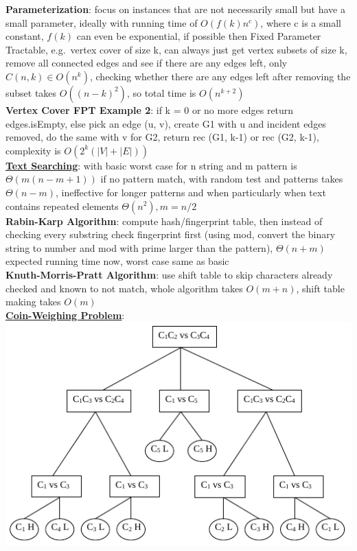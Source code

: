 \documentclass[a4paper]{article}
\begin{document}
\begin{multicols}{2}
        \textbf{Parameterization}: focus on instances that are not necessarily small but have a small parameter, ideally with running time of $O(f(k)n^c)$, where c is a small constant, $f(k)$ can even be exponential, if possible then Fixed Parameter Tractable, e.g.\ vertex cover of size k, can always just get vertex subsets of size k, remove all connected edges and see if there are any edges left, only $C(n, k) \in O(n^k)$, checking whether there are any edges left after removing the subset takes $O({(n-k)}^2)$, so total time is $O(n^{k+2})$\\
        \textbf{Vertex Cover FPT Example 2}: if k = 0 or no more edges return edges.isEmpty, else pick an edge (u, v), create G1 with u and incident edges removed, do the same with v for G2, return rec (G1, k-1) or rec (G2, k-1), complexity is $O(2^k (|V|+|E|))$\\
        \underline{\textbf{Text Searching}}: with basic worst case for n string and m pattern is $\Theta(m(n-m+1))$ if no pattern match, with random test and patterns takes $\Theta(n-m)$, ineffective for longer patterns and when particularly when text contains repeated elements $\Theta(n^2), m=n/2$\\
        \textbf{Rabin-Karp Algorithm}: compute hash/fingerprint table, then instead of checking every substring check fingerprint first (using mod, convert the binary string to number and mod with prime larger than the pattern), $\Theta(n+m)$ expected running time now, worst case same as basic\\
        \textbf{Knuth-Morris-Pratt Algorithm}: use shift table to skip characters already checked and known to not match, whole algorithm takes $O(m+n)$, shift table making takes $O(m)$\\
        \underline{\textbf{Coin-Weighing Problem}}:\\
        \includegraphics[width=\linewidth]{coinweigh.png}\\
    \end{multicols}
    
\end{document}
